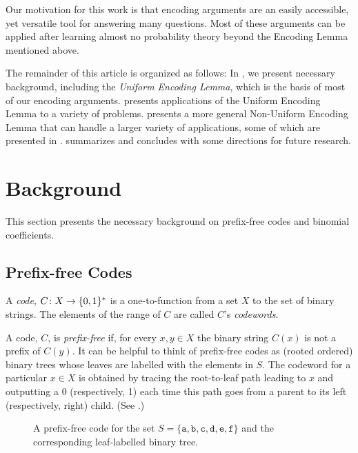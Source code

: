 \documentclass[lotsofwhite]{patmorin}
\begin{document}
Our motivation for this work is that encoding arguments are an easily
accessible, yet versatile tool for answering many questions.  Most of
these arguments can be applied after learning almost no probability
theory beyond the Encoding Lemma mentioned above.

The remainder of this article is organized as follows: In ,
we present necessary background, including the \emph{Uniform
Encoding Lemma}, which is the basis of most of our encoding arguments.
 presents  applications of the Uniform Encoding
Lemma to a variety of problems.   presents a more
general Non-Uniform Encoding Lemma that can handle a larger variety of
applications, some of which are presented in .
 summarizes and concludes with some directions for
future research.



\section{Background}

This section presents the necessary background on prefix-free codes and binomial coefficients.

\subsection{Prefix-free Codes}

A \emph{code}, $C\colon X\to \{0,1\}^*$ is a one-to-function from a set
$X$ to the set of binary strings.  The elements of the range of $C$ are
called $C$'s \emph{codewords}.

A code, $C$, is \emph{prefix-free} if, for every $x,y\in X$ the binary
string $C(x)$ is not a prefix of $C(y)$.  It can be helpful to think
of prefix-free codes as (rooted ordered) binary trees whose leaves
are labelled with the elements in $S$.  The codeword for a particular
$x\in X$ is obtained by tracing the root-to-leaf path leading to $x$
and outputting a 0 (respectively, 1) each time this path goes from a
parent to its left (respectively, right) child. (See .)

\begin{figure}
  \caption{A prefix-free code for the set
    $S=\{\mathtt{a},\mathtt{b},\mathtt{c},\mathtt{d},\mathtt{e},\mathtt{f}\}$
    and the corresponding leaf-labelled binary tree.}
\end{figure}
\end{document}
